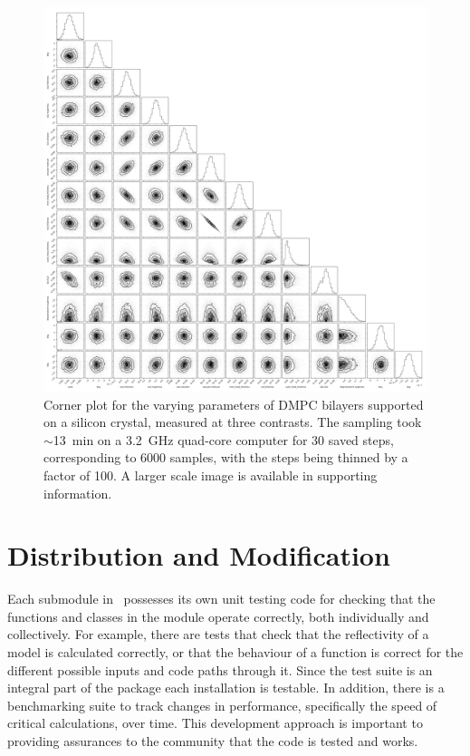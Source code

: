 \documentclass[pdf,preprint]{iucr}
\begin{document}
\begin{figure}
  \includegraphics[width=175mm]{./supporting_information/corner.pdf}
  \caption{Corner plot for the varying parameters of DMPC bilayers supported on a silicon crystal, measured at three contrasts. The sampling took $\sim$\SI{13}{\minute} on a \SI{3.2}{GHz} quad-core computer for 30 saved steps, corresponding to 6000 samples, with the steps being thinned by a factor of 100. A larger scale image is available in supporting information.}
  \label{fig:corner}
\end{figure}

 
\section{Distribution and Modification}

Each submodule in \ possesses its own unit testing code for checking that the functions and classes in the module operate correctly, both individually and collectively. For example, there are tests that check that the reflectivity of a model is calculated correctly, or that the behaviour of a function is correct for the different possible inputs and code paths through it. Since the test suite is an integral part of the package each installation is testable. In addition, there is a benchmarking suite to track changes in performance, specifically the speed of critical calculations, over time. This development approach is important to providing assurances to the community that the code is tested and works.
\end{document}
